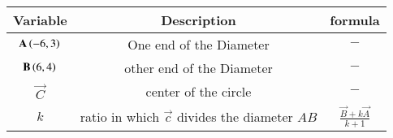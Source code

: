 \begin{tabular}[12pt]{ |c| c|c|}
    \hline
        \textbf{Variable} & \textbf{Description} & \textbf{formula}\\
    \hline
        $\mathbf{A}\left(-6,3\right)$ & One end of the Diameter & $-$ \\
    \hline 
        $\mathbf{B} \left(6,4\right)$ & other end of the Diameter & $-$\\
    \hline
        $\vec{C}$& center of the circle & $-$\\ 
    \hline
        $k$ & ratio in which $\vec{c}$ divides the diameter $AB$ & $\frac{\vec{B}+k\vec{A}}{k+1}$\\
    \hline       
\end{tabular}

